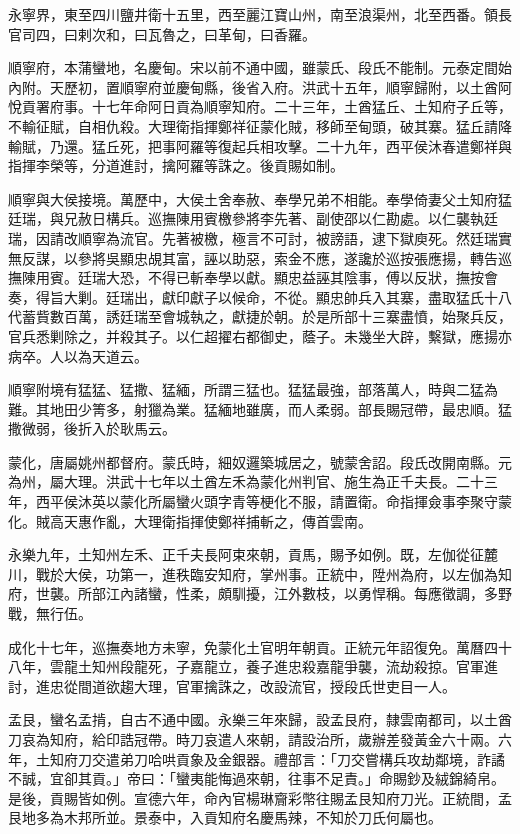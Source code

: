 \begin{pinyinscope}
永寧界，東至四川鹽井衛十五里，西至麗江寶山州，南至浪渠州，北至西番。領長官司四，曰剌次和，曰瓦魯之，曰革甸，曰香羅。

順寧府，本蒲蠻地，名慶甸。宋以前不通中國，雖蒙氏、段氏不能制。元泰定間始內附。天歷初，置順寧府並慶甸縣，後省入府。洪武十五年，順寧歸附，以土酋阿悅貢署府事。十七年命阿日貢為順寧知府。二十三年，土酋猛丘、土知府子丘等，不輸征賦，自相仇殺。大理衛指揮鄭祥征蒙化賊，移師至甸頭，破其寨。猛丘請降輸賦，乃還。猛丘死，把事阿羅等復起兵相攻擊。二十九年，西平侯沐春遣鄭祥與指揮李榮等，分道進討，擒阿羅等誅之。後貢賜如制。

順寧與大侯接境。萬歷中，大侯土舍奉赦、奉學兄弟不相能。奉學倚妻父土知府猛廷瑞，與兄赦日構兵。巡撫陳用賓檄參將李先著、副使邵以仁勘處。以仁襲執廷瑞，因請改順寧為流官。先著被檄，極言不可討，被謗語，逮下獄庾死。然廷瑞實無反謀，以參將吳顯忠覘其富，誣以助惡，索金不應，遂讒於巡按張應揚，轉告巡撫陳用賓。廷瑞大恐，不得已斬奉學以獻。顯忠益誣其陰事，傅以反狀，撫按會奏，得旨大剿。廷瑞出，獻印獻子以候命，不從。顯忠帥兵入其寨，盡取猛氏十八代蓄貲數百萬，誘廷瑞至會城執之，獻捷於朝。於是所部十三寨盡憤，始聚兵反，官兵悉剿除之，并殺其子。以仁超擢右都御史，蔭子。未幾坐大辟，繫獄，應揚亦病卒。人以為天道云。

順寧附境有猛猛、猛撒、猛緬，所謂三猛也。猛猛最強，部落萬人，時與二猛為難。其地田少箐多，射獵為業。猛緬地雖廣，而人柔弱。部長賜冠帶，最忠順。猛撒微弱，後折入於耿馬云。

蒙化，唐屬姚州都督府。蒙氏時，細奴邏築城居之，號蒙舍詔。段氏改開南縣。元為州，屬大理。洪武十七年以土酋左禾為蒙化州判官、施生為正千夫長。二十三年，西平侯沐英以蒙化所屬蠻火頭字青等梗化不服，請置衛。命指揮僉事李聚守蒙化。賊高天惠作亂，大理衛指揮使鄭祥捕斬之，傳首雲南。

永樂九年，土知州左禾、正千夫長阿束來朝，貢馬，賜予如例。既，左伽從征麓川，戰於大侯，功第一，進秩臨安知府，掌州事。正統中，陞州為府，以左伽為知府，世襲。所部江內諸蠻，性柔，頗馴擾，江外數枝，以勇悍稱。每應徵調，多野戰，無行伍。

成化十七年，巡撫奏地方未寧，免蒙化土官明年朝貢。正統元年詔復免。萬曆四十八年，雲龍土知州段龍死，子嘉龍立，養子進忠殺嘉龍爭襲，流劫殺掠。官軍進討，進忠從間道欲趨大理，官軍擒誅之，改設流官，授段氏世吏目一人。

孟艮，蠻名孟掯，自古不通中國。永樂三年來歸，設孟艮府，隸雲南都司，以土酋刀哀為知府，給印誥冠帶。時刀哀遣人來朝，請設治所，歲辦差發黃金六十兩。六年，土知府刀交遣弟刀哈哄貢象及金銀器。禮部言：「刀交嘗構兵攻劫鄰境，詐譎不誠，宜卻其貢。」帝曰：「蠻夷能悔過來朝，往事不足責。」命賜鈔及絨錦綺帛。是後，貢賜皆如例。宣德六年，命內官楊琳齎彩幣往賜孟艮知府刀光。正統間，孟艮地多為木邦所並。景泰中，入貢知府名慶馬辣，不知於刀氏何屬也。


\end{pinyinscope}
